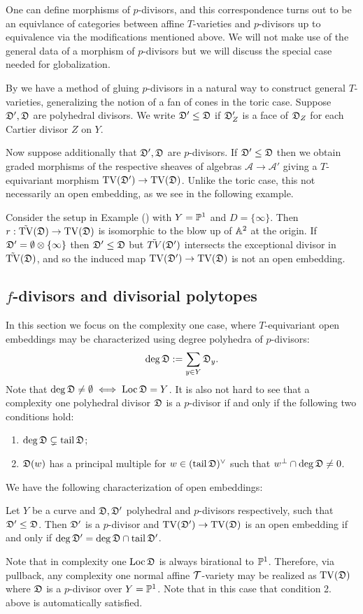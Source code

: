 One can define morphisms of \(p\)-divisors, and this correspondence turns out to be an equivlance of categories between affine \(T\)-varieties and \(p\)-divisors up to equivalence via the modifications mentioned above. We will not make use of the general data of a morphism of \(p\)-divisors but we will discuss the special case needed for globalization.

By \cite{altmann2008gluing} we have a method of gluing \(p\)-divisors in a natural way to construct general \(T\)-varieties, generalizing the notion of a fan of cones in the toric case. Suppose \({\mathfrak{D}}',{\mathfrak{D}}\) are polyhedral divisors. We write \({\mathfrak{D}}' \le {\mathfrak{D}}\) if \({\mathfrak{D}}_Z'\) is a face of \({\mathfrak{D}}_Z\) for each Cartier divisor \(Z\) on \(Y\).

Now suppose additionally that \({\mathfrak{D}}',{\mathfrak{D}}\) are \(p\)-divisors. If \({\mathfrak{D}}' \le {\mathfrak{D}}\) then we obtain graded morphisms of the respective sheaves of algebras \(\mathcal{A} \to \mathcal{A}'\) giving a \(T\)-equivariant morphism \(\operatorname{TV}({\mathfrak{D}}') \to \operatorname{TV}({\mathfrak{D}})\). Unlike the toric case, this not necessarily an open embedding, as we see in the following example.
\begin{example}
Consider the setup in Example () with \(Y = \mathbb{P}^1\) and \(D = \{\infty\}\). Then \(r: \tilde{\operatorname{TV}}({\mathfrak{D}}) \to \operatorname{TV}({\mathfrak{D}})\) is isomorphic to the blow up of \(\mathbb{A}^2\) at the origin. If \({\mathfrak{D}}' = \emptyset \otimes \{\infty\}\) then \({\mathfrak{D}}' \le {\mathfrak{D}}\) but \(\tilde{TV}({\mathfrak{D}}')\) intersects the exceptional divisor in \(\tilde{\operatorname{TV}}({\mathfrak{D}})\), and so the induced map \(\operatorname{TV}({\mathfrak{D}}') \to \operatorname{TV}({\mathfrak{D}})\) is not an open embedding.
\end{example}
\subsection{\(f\)-divisors and divisorial polytopes}
In this section we focus on the complexity one case, where \(T\)-equivariant open embeddings may be characterized using degree polyhedra of \(p\)-divisors:
\[
\deg {\mathfrak{D}} := \sum_{y \in Y} {\mathfrak{D}}_y.
\]
Note that \(\deg {\mathfrak{D}} \neq \emptyset \iff \operatorname{Loc} {\mathfrak{D}} = Y\). It is also not hard to see that a complexity one polyhedral divisor \({\mathfrak{D}}\) is a \(p\)-divisor if and only if the following two conditions hold:
\begin{enumerate}
\item \(\deg {\mathfrak{D}} \subsetneq \operatorname{tail} {\mathfrak{D}}\);
\item \({\mathfrak{D}}(w)\) has a principal multiple for \(w \in (\operatorname{tail} {\mathfrak{D}} )^\vee\) such that \(w^\perp \cap \deg {\mathfrak{D}} \neq 0\).
\end{enumerate}
We have the following characterization of open embeddings:
\begin{theorem}
Let \(Y\) be a curve and \({\mathfrak{D}},{\mathfrak{D}}'\) polyhedral and \(p\)-divisors respectively, such that \({\mathfrak{D}}' \le {\mathfrak{D}}\). Then \({\mathfrak{D}}'\) is a \(p\)-divisor and \(\operatorname{TV}({\mathfrak{D}}') \to \operatorname{TV}({\mathfrak{D}}) \) is an open embedding if and only if \(\deg {\mathfrak{D}}' = \deg {\mathfrak{D}} \cap \operatorname{tail} {\mathfrak{D}}'\).
\end{theorem}
Note that in complexity one \(\operatorname{Loc} {\mathfrak{D}} \) is always birational to \(\mathbb{P}^1\). Therefore, via pullback, any complexity one normal affine \({\mathcal{T}}\)-variety may be realized as \(\operatorname{TV}({\mathfrak{D}})\) where \({\mathfrak{D}}\) is a \(p\)-divisor over \(Y = \mathbb{P}^1\). Note that in this case that condition 2. above is automatically satisfied.

